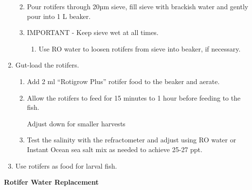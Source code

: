 \documentclass[
  letterpaper,
  DIV=11,
  numbers=noendperiod]{scrreprt}
\providecommand{\tightlist}{%
  \setlength{\itemsep}{0pt}\setlength{\parskip}{0pt}}\usepackage{longtable,booktabs,array}
\begin{document}
\begin{enumerate}
  \begin{enumerate}
  \def\labelenumii{\arabic{enumii}.}
  \tightlist
  \item
    Pour rotifers through 20µm sieve, fill sieve with brackish water and
    gently pour into 1 L beaker.
  \item
    IMPORTANT - Keep sieve wet at all times.

    \begin{enumerate}
    \def\labelenumiii{\arabic{enumiii}.}
    \tightlist
    \item
      Use RO water to loosen rotifers from sieve into beaker, if
      necessary.
    \end{enumerate}
  \end{enumerate}
\item
  Gut-load the rotifers.

  \begin{enumerate}
  \def\labelenumii{\arabic{enumii}.}
  \item
    Add 2 ml ``Rotigrow Plus'' rotifer food to the beaker and aerate.
  \item
    Allow the rotifers to feed for 15 minutes to 1 hour before feeding
    to the fish.

    \begin{tcolorbox}[enhanced jigsaw, rightrule=.15mm, title=\textcolor{quarto-callout-warning-color}{\faExclamationTriangle}\hspace{0.5em}{NOTES}, titlerule=0mm, opacitybacktitle=0.6, toprule=.15mm, bottomrule=.15mm, opacityback=0, left=2mm, colframe=quarto-callout-warning-color-frame, breakable, coltitle=black, colback=white, colbacktitle=quarto-callout-warning-color!10!white, bottomtitle=1mm, leftrule=.75mm, toptitle=1mm, arc=.35mm]

    Adjust down for smaller harvests

    \end{tcolorbox}
  \item
    Test the salinity with the refractometer and adjust using RO water
    or Instant Ocean sea salt mix as needed to achieve 25-27 ppt.
  \end{enumerate}
\item
  Use rotifers as food for larval fish.
\end{enumerate}

\textbf{Rotifer Water Replacement}
\end{document}
